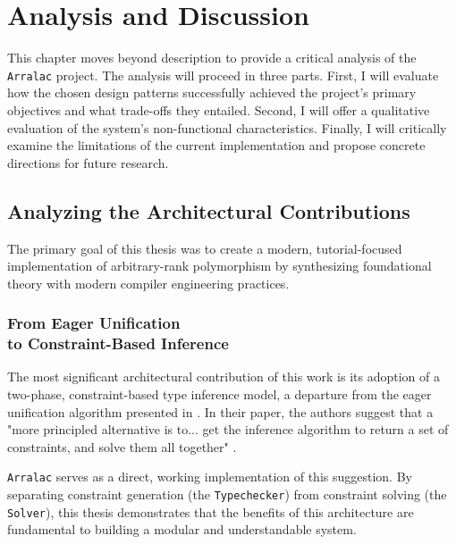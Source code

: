 \chapter{Analysis and Discussion}
\label{chap:AnalysisAndDiscussion}

This chapter moves beyond description to provide a critical analysis of the \texttt{Arralac} project. The analysis will proceed in three parts. First, I will evaluate how the chosen design patterns successfully achieved the project's primary objectives and what trade-offs they entailed. Second, I will offer a qualitative evaluation of the system's non-functional characteristics. Finally, I will critically examine the limitations of the current implementation and propose concrete directions for future research.

\section{Analyzing the Architectural Contributions}
\label{sec:Discussion:Objectives}

The primary goal of this thesis was to create a modern, tutorial-focused implementation of arbitrary-rank polymorphism by synthesizing foundational theory with modern compiler engineering practices.

\subsection{From Eager Unification \\ to Constraint-Based Inference}
The most significant architectural contribution of this work is its adoption of a two-phase, constraint-based type inference model, a departure from the eager unification algorithm presented in \cite{jones-practical-2007}. In their paper, the authors suggest that a "more principled alternative is to... get the inference algorithm to return a set of constraints, and solve them all together" \cite[Sec. 9.6]{jones-practical-2007}.

\texttt{Arralac} serves as a direct, working implementation of this suggestion. By separating constraint generation (the \texttt{Typechecker}) from constraint solving (the \texttt{Solver}), this thesis demonstrates that the benefits of this architecture are fundamental to building a modular and understandable system.


